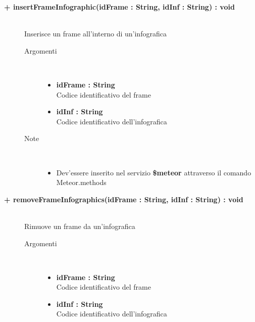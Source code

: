 \begin{description}
	\begin{description}
		\item[\textbf{\color{blue}+ insertFrameInfographic(idFrame : String, idInf : String) : void			}] \hfill \\
			Inserisce un frame all'interno di un'infografica
			
		\begin{description}
			\item[Argomenti] \hfill \\
				\begin{itemize}
				
					\item \textbf{idFrame : String			} \hfill \\
					Codice identificativo del frame
					\item \textbf{idInf : String			} \hfill \\
					Codice identificativo dell'infografica
					
				\end{itemize}
			\item[Note] \hfill \\
			\begin{itemize}
					\item Dev'essere inserito nel servizio \textbf{\$meteor} attraverso il comando Meteor.methods
				\end{itemize}
		\end{description}
	\end{description}
	
	\begin{description}
		\item[\textbf{\color{blue}+ removeFrameInfographics(idFrame : String, idInf : String) : void			}] \hfill \\
			Rimuove un frame da un'infografica
			
		\begin{description}
			\item[Argomenti] \hfill \\
				\begin{itemize}
				
					\item \textbf{idFrame : String			} \hfill \\
					Codice identificativo del frame
					\item \textbf{idInf : String			} \hfill \\
					Codice identificativo dell'infografica
					

\end{itemize}
\end{description}
\end{description}
\end{description}
